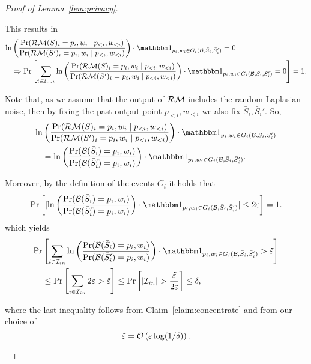 \documentclass[12pt,a4paper,oneside,onecolumn]{book}
\begin{document}
\begin{proof}[Proof of Lemma~\ref{lem:privacy}]
\begin{innerproof}[Proof of (ii)]
  This results in
  \begin{align*}
    \label{eq:2}
    \ln&
    \left(
      \frac{\Pr(\RandMargin(S)_i=p_i,w_i\mid p_{<i},w_{<i})}
      {\Pr(\RandMargin(S')_i=p_i,w_i\mid p_{<i},w_{<i})}
    \right)
    \cdot \indicator{p_i,w_i \in G_{i}(\blackbox,\bar{S}_i,\bar{S}_i')}
    = 0 \\
    &\Rightarrow
    \Pr\left[\sum_{i\in \event{out}}\ln
    \left(
      \frac{\Pr(\RandMargin(S)_i=p_i,w_i\mid p_{<i},w_{<i})}
      {\Pr(\RandMargin(S')_i=p_i,w_i\mid p_{<i},w_{<i})}
    \right)
    \cdot \indicator{p_i,w_i \in G_{i}(\blackbox,\bar{S}_i,\bar{S}_i')}
    = 0 \right] = 1
    .
  \end{align*}
\end{innerproof}

\begin{innerproof}
Note that, as we assume that the output of $\mathcal{RM}$ includes the random Laplasian noise,
  then by fixing the past output-point $p_{<i},w_{<i}$
  we also fix $\bar{S}_i,\bar{S}_i'$.
  So,
  \begin{align*}
    \ln&
    \left(
      \frac{\Pr(\RandMargin(S)_i=p_i,w_i\mid p_{<i},w_{<i})}
      {\Pr(\RandMargin(S')_i=p_i,w_i\mid p_{<i},w_{<i})}
    \right)    
    \cdot \indicator{p_i,w_i  \in G_{i}(\blackbox,\bar{S}_i,\bar{S}_i')} \\
    & =
     \ln
    \left(
      \frac{\Pr(\blackbox(\bar{S}_i)=p_i,w_i)}{\Pr(\blackbox(\bar{S}'_i)=p_i,w_i)}
    \right)
    \cdot \indicator{p_i,w_i  \in G_{i}(\blackbox,\bar{S}_i,\bar{S}_i')}.
  \end{align*}
    
    Moreover, by the definition of the events $G_i$ it holds that
  \[
    \Pr\left[ \abs{\ln
    \left(
      \frac{\Pr(\blackbox(\bar{S}_i)=p_i,w_i)}{\Pr(\blackbox(\bar{S}'_i)=p_i,w_i)}
    \right)
    \cdot \indicator{p_i,w_i  \in G_{i}(\blackbox,\bar{S}_i,\bar{S}_i')}} \leq 2\varepsilon \right] = 1.
  \]
  which yields
  \begin{align*}
  \Pr&\left[
   \sum_{i\in\event{in}}
  \ln
    \left(
      \frac{\Pr(\blackbox(\bar{S}_i)=p_i,w_i)}{\Pr(\blackbox(\bar{S}'_i)=p_i,w_i)}
    \right)
    \cdot \indicator{p_i,w_i  \in G_{i}(\blackbox,\bar{S}_i,\bar{S}_i')} 
    > 
    \bigeps
    \right] \\
    &\leq
    \Pr\left[
    \sum_{i\in\event{in}} 2\varepsilon
    >
    \bigeps
    \right]    
    \leq
    \Pr\left[
    \abs{\event{in}}
    >
    \frac{\bigeps}{2\varepsilon}
    \right]
    \leq \delta,
  \end{align*}
 
 where the last inequality follows from 
 Claim~\ref{claim:concentrate} and from our choice of 
$$
 \tilde{\varepsilon} = \mathcal{O}\left(\varepsilon\log(1/\delta)\right).
$$
 \end{innerproof}

\end{proof}
\end{document}
